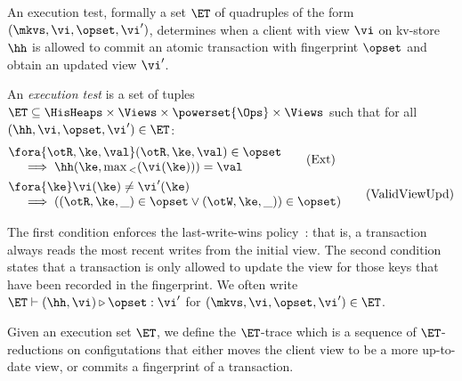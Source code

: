 An execution test, formally a set $\ET$ of quadruples of the form $(\mkvs, \vi, \opset, \vi')$,
determines when a client with view $\vi$ on kv-store $\hh$ 
is allowed to commit an atomic  transaction with fingerprint
$\opset$  and obtain an updated view $\vi'$. 


\begin{definition}
\label{def:execution.test}
An \emph{execution test} is a set of tuples $\ET \subseteq \HisHeaps \times \Views \times \powerset{\Ops} \times \Views$ 
such that for all $(\hh, \vi, \opset, \vi') \in \ET$:
\begin{align}
    & 
    \begin{array}{@{}l@{}}
    \fora{\otR, \ke, \val} (\otR, \ke, \val) \in \opset \\
    \quad {} \implies 
    \hh(\ke, \max{}_{<}(\vi(\ke))) = \val  
    \end{array}
    \tag{Ext} \label{eq:read-external} \\
    & 
    \begin{array}{@{}l@{}}
    \fora{\ke} \vi(\ke) \neq \vi'(\ke) \\
    \quad {} \implies
    ( (\otR, \ke, \_) \in \opset \vee (\otW, \ke, \_)) \in \opset) 
    \end{array}
    \tag{ValidViewUpd} \label{eq:valid-view-update}
\end{align}
\end{definition}
\noindent 
The first condition enforces the last-write-wins policy~\cite{}: that
is, a transaction always reads the most recent writes from the initial
view.  The second condition states that a transaction is only allowed
to update the view for those keys that have been recorded in the
fingerprint. 
We often write   $\ET
\vdash (\hh, \vi) \triangleright \opset: \vi'$  for $(\mkvs, \vi,
\opset, \vi') \in \ET$. 

\noindent Given an execution set  $\ET$, we define the $\ET$-trace which is a
sequence of $\ET$-reductions on configutations that either moves the
client view to be a more up-to-date view, or commits a fingerprint of
a transaction. 

